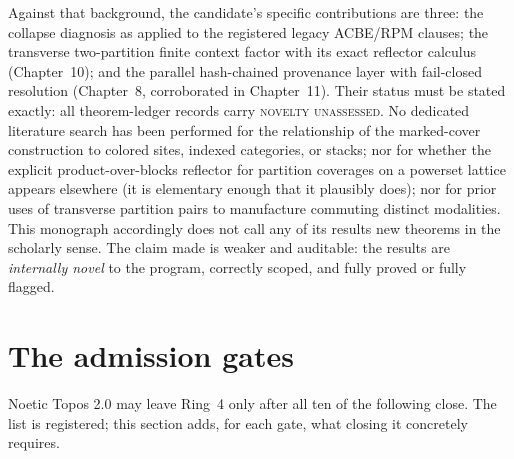 Against that background, the candidate's specific contributions are three:
the collapse diagnosis as applied to the registered legacy ACBE/RPM
clauses; the transverse two-partition finite context factor with its exact
reflector calculus (Chapter~10); and the parallel hash-chained provenance
layer with fail-closed resolution (Chapter~8, corroborated in
Chapter~11). Their status must be
stated exactly: all theorem-ledger records carry
\textsc{novelty unassessed}. No dedicated literature search has been
performed for the relationship of the marked-cover construction to colored
sites, indexed categories, or stacks; nor for whether the explicit
product-over-blocks reflector for partition coverages on a powerset
lattice appears elsewhere (it is elementary enough that it plausibly
does); nor for prior uses of transverse partition pairs to manufacture
commuting distinct modalities. This monograph accordingly does not call
any of its results new theorems in the scholarly sense. The claim made is
weaker and auditable: the results are \emph{internally novel} to the
program, correctly scoped, and fully proved or fully flagged.

\section{The admission gates}
\label{ch12:sec:gates}

Noetic Topos 2.0 may leave Ring~4 only after all ten of the following
close. The list is registered; this section adds, for each gate, what
closing it concretely requires.

